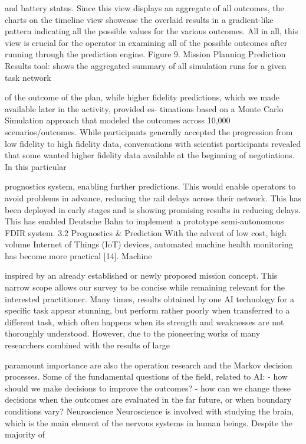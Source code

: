 \documentclass[a4paper,12pt]{article}
\begin{document}
and battery status. Since this view displays an aggregate of
all outcomes, the charts on the timeline view showcase the
overlaid results in a gradient-like pattern indicating all the
possible values for the various outcomes. All in all, this view
is crucial for the operator in examining all of the possible
outcomes after running through the prediction engine.
Figure 9. Mission Planning Prediction Results tool: shows
the aggregated summary of all simulation runs for a given
task network

of the outcome of the plan, while higher ﬁdelity predictions,
which we made available later in the activity, provided es-
timations based on a Monte Carlo Simulation approach that
modeled the outcomes across 10,000 scenarios/outcomes.
While participants generally accepted the progression from
low ﬁdelity to high ﬁdelity data, conversations with scientist
participants revealed that some wanted higher ﬁdelity data
available at the beginning of negotiations. In this particular

prognostics system, enabling further predictions. This would enable operators to
avoid problems in advance, reducing the rail delays across their network. This has
been deployed in early stages and is showing promising results in reducing delays.
This has enabled Deutsche Bahn to implement a prototype semi-autonomous
FDIR system.
3.2
Prognostics & Prediction
With the advent of low cost, high volume Internet of Things (IoT) devices,
automated machine health monitoring has become more practical [14]. Machine

inspired by an already established or newly proposed mission concept. This narrow
scope allows our survey to be concise while remaining relevant for the interested
practitioner.
Many times, results obtained by one AI technology for a speciﬁc task appear
stunning, but perform rather poorly when transferred to a different task, which often
happens when its strength and weaknesses are not thoroughly understood. However,
due to the pioneering works of many researchers combined with the results of large

paramount importance are also the 
operation research and the Markov 
decision 
processes. 
Some of the fundamental questions of 
the 
field, 
related 
to 
AI: 
- how should we make decisions to 
improve 
the 
outcomes? 
- how can we change these decisions 
when the outcomes are evaluated in the 
far future, or when boundary conditions 
vary? 
Neuroscience 
Neuroscience is involved with 
studying the brain, which is the main 
element of the nervous systems in 
human beings. Despite the majority of
\end{document}
